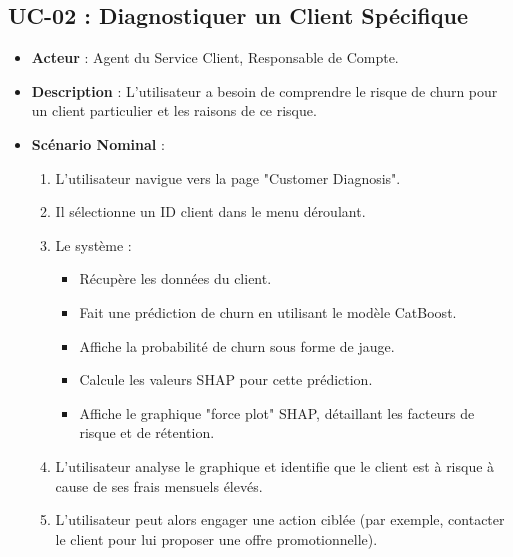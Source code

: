 \subsection{UC-02 : Diagnostiquer un Client Spécifique}
\begin{itemize}
    \item \textbf{Acteur} : Agent du Service Client, Responsable de Compte.
    \item \textbf{Description} : L'utilisateur a besoin de comprendre le risque de churn pour un client particulier et les raisons de ce risque.
    \item \textbf{Scénario Nominal} :
    \begin{enumerate}
        \item L'utilisateur navigue vers la page "Customer Diagnosis".
        \item Il sélectionne un ID client dans le menu déroulant.
        \item Le système :
        \begin{itemize}
            \item Récupère les données du client.
            \item Fait une prédiction de churn en utilisant le modèle CatBoost.
            \item Affiche la probabilité de churn sous forme de jauge.
            \item Calcule les valeurs SHAP pour cette prédiction.
            \item Affiche le graphique "force plot" SHAP, détaillant les facteurs de risque et de rétention.
        \end{itemize}
        \item L'utilisateur analyse le graphique et identifie que le client est à risque à cause de ses frais mensuels élevés.
        \item L'utilisateur peut alors engager une action ciblée (par exemple, contacter le client pour lui proposer une offre promotionnelle).
    \end{enumerate}
\end{itemize}

